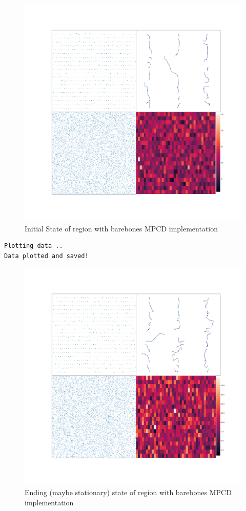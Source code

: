 \documentclass[
]{article}
\begin{document}
\begin{figure}
\centering
\includegraphics{Assets/initial_region.png}
\caption{Initial State of region with barebones MPCD implementation}
\end{figure}

\begin{verbatim}
Plotting data ..
Data plotted and saved!
\end{verbatim}

\begin{figure}
\centering
\includegraphics{Assets/stationary_region.png}
\caption{Ending (maybe stationary) state of region with barebones MPCD
implementation}
\end{figure}
\end{document}
